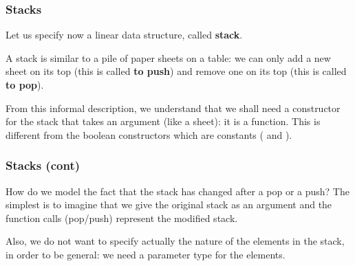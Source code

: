 
%
\begin{frame}
\frametitle{Stacks}

Let us specify now a linear data structure, called \textbf{stack}.

\bigskip

A stack is similar to a pile of paper sheets on a table: we can only
add a new sheet on its top (this is called \textbf{to push}) and
remove one on its top (this is called \textbf{to pop}).

\bigskip

From this informal description, we understand that we shall need a
constructor for the stack that takes an argument (like a sheet): it is
a function. This is different from the boolean constructors which are
constants ( and ).

\end{frame}

%
\begin{frame}
\frametitle{Stacks (cont)}

How do we model the fact that the stack has changed after a pop or a
push? The simplest is to imagine that we give the original stack as an
argument and the function calls (pop/push) represent the modified
stack.

\bigskip

Also, we do not want to specify actually the nature of the elements in
the stack, in order to be general: we need a parameter type for the
elements.

\end{frame}

